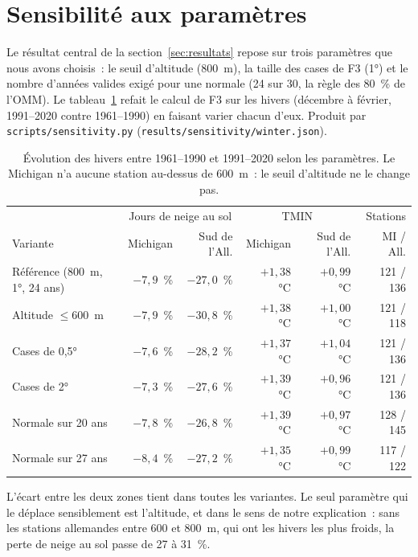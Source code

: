 \section{Sensibilité aux paramètres}
\label{annexe:sensibilite}

Le résultat central de la section~\ref{sec:resultats} repose sur trois paramètres que nous avons choisis~: le seuil d'altitude (800~m), la taille des cases de F3 (1°) et le nombre d'années valides exigé pour une normale (24 sur 30, la règle des 80~\% de l'OMM). Le tableau~\ref{tab:sensibilite} refait le calcul de F3 sur les hivers (décembre à février, 1991--2020 contre 1961--1990) en faisant varier chacun d'eux. Produit par \texttt{scripts/sensitivity.py} (\texttt{results/sensitivity/winter.json}).

\begin{table}[h!]
  \centering
  \small
  \begin{tabular}{lrrrrr}
    \hline
    & \multicolumn{2}{c}{Jours de neige au sol} & \multicolumn{2}{c}{TMIN} & Stations \\
    Variante & Michigan & Sud de l'All. & Michigan & Sud de l'All. & MI / All. \\
    \hline
    Référence (800~m, 1°, 24 ans) & $-7,9$~\% & $-27,0$~\% & $+1,38$~°C & $+0,99$~°C & 121 / 136 \\
    Altitude $\leq 600$~m & $-7,9$~\% & $-30,8$~\% & $+1,38$~°C & $+1,00$~°C & 121 / 118 \\
    Cases de 0,5° & $-7,6$~\% & $-28,2$~\% & $+1,37$~°C & $+1,04$~°C & 121 / 136 \\
    Cases de 2° & $-7,3$~\% & $-27,6$~\% & $+1,39$~°C & $+0,96$~°C & 121 / 136 \\
    Normale sur 20 ans & $-7,8$~\% & $-26,8$~\% & $+1,39$~°C & $+0,97$~°C & 128 / 145 \\
    Normale sur 27 ans & $-8,4$~\% & $-27,2$~\% & $+1,35$~°C & $+0,99$~°C & 117 / 122 \\
    \hline
  \end{tabular}
  \caption{Évolution des hivers entre 1961--1990 et 1991--2020 selon les paramètres. Le Michigan n'a aucune station au-dessus de 600~m~: le seuil d'altitude ne le change pas.}
  \label{tab:sensibilite}
\end{table}

L'écart entre les deux zones tient dans toutes les variantes. Le seul paramètre qui le déplace sensiblement est l'altitude, et dans le sens de notre explication~: sans les stations allemandes entre 600 et 800~m, qui ont les hivers les plus froids, la perte de neige au sol passe de 27 à 31~\%.
